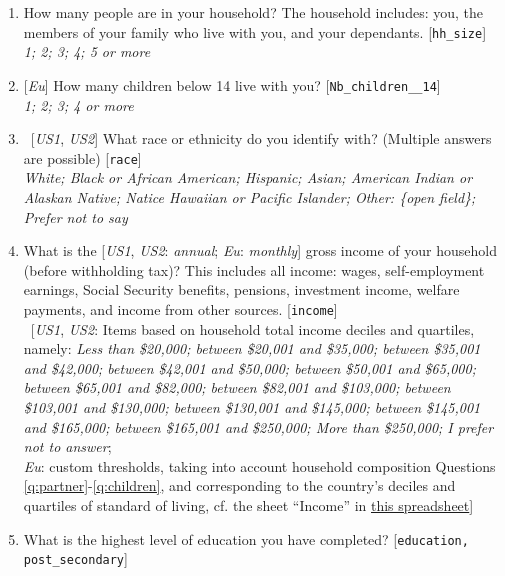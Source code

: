 \begin{enumerate}
\item  How many people are in your household? The household includes: you, the members of your family who live with you, and your dependants. [\verb|hh_size|] %
\\ \textit{1; 2; 3; 4; 5 or more}
\item  \label{q:children} [\textit{Eu}] How many children below 14 live with you? [\verb|Nb_children__14|]
\\ \textit{1; 2; 3; 4 or more}
\item ~[\textit{US1}, \textit{US2}] What race or ethnicity do you identify with? (Multiple answers are possible) [\verb|race|]
\\ \textit{White; Black or African American; Hispanic; Asian; American Indian or Alaskan Native; Natice Hawaiian or Pacific Islander; Other: \{open field\}; Prefer not to say}
\item What is the [\textit{US1}, \textit{US2}: \textit{annual}; \textit{Eu}: \textit{monthly}] gross income of your household (before withholding tax)? This includes all income: wages, self-employment earnings, Social Security benefits, pensions, investment income, welfare payments, and income from other sources. [\verb|income|] %
\\ ~[\textit{US1}, \textit{US2}: Items based on household total income deciles and quartiles, namely: \textit{Less than \$20,000; between \$20,001 and \$35,000; between \$35,001 and \$42,000; between \$42,001 and \$50,000; between \$50,001 and \$65,000; between \$65,001 and \$82,000; between \$82,001 and \$103,000; between \$103,001 and \$130,000; between \$130,001 and \$145,000; between \$145,001 and \$165,000; between \$165,001 and \$250,000; More than \$250,000; I prefer not to answer}; \\ \textit{Eu}: custom thresholds, taking into account household composition Questions \ref{q:partner}-\ref{q:children}, and corresponding to the country's deciles and quartiles of standard of living, cf. the sheet ``Income'' in \href{https://github.com/bixiou/international_attitudes_toward_global_policies/raw/main/questionnaire/specificities.xlsx}{this spreadsheet}]
\item  What is the highest level of education you have completed? [\verb|education, post_secondary|]

\end{enumerate}
